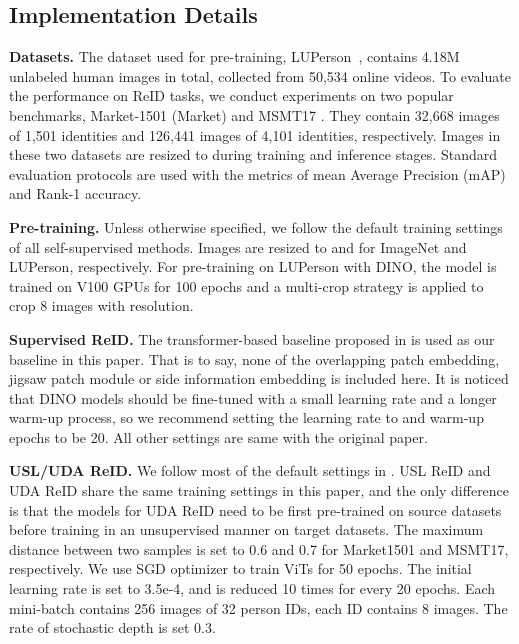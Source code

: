 \documentclass[10pt,twocolumn,letterpaper]{article}
\begin{document}
\subsection{Implementation Details}

\noindent\textbf{Datasets.} The dataset used for pre-training, LUPerson~\cite{fu2021unsupervised}, contains 4.18M unlabeled human images in total, collected from 50,534 online videos. To evaluate the performance on ReID tasks, we conduct experiments on two popular benchmarks, \ie Market-1501 (Market) \cite{Market1501} and MSMT17 \cite{MSMT17}. They contain 32,668 images of 1,501 identities and 126,441 images of 4,101 identities, respectively. Images in these two datasets are resized to  during training and inference stages. Standard evaluation protocols are used with the metrics of mean Average Precision (mAP) and Rank-1 accuracy.

\noindent\textbf{Pre-training.} Unless otherwise specified, we follow the default training settings of all self-supervised methods. Images are resized to  and  for ImageNet and LUPerson, respectively. For pre-training on LUPerson with DINO, the model is trained on V100 GPUs for 100 epochs and a multi-crop strategy is applied to crop 8 images with  resolution. 


\noindent\textbf{Supervised ReID.} The transformer-based baseline proposed in \cite{he2021transreid} is used as our baseline in this paper. That is to say, none of the overlapping patch embedding, jigsaw patch module or side information embedding is included here. It is noticed that DINO models should be fine-tuned with a small learning rate and a longer warm-up process, so we recommend setting the learning rate to  and warm-up epochs to be 20. All other settings are same with the original paper.

\noindent\textbf{USL/UDA ReID.} We follow most of the default settings in \cite{dai2021cluster}. USL ReID and UDA ReID share the same training settings in this paper, and the only difference is that the models for UDA ReID need to be first pre-trained on source datasets before training in an unsupervised manner on target datasets. The maximum distance  between two samples is set to 0.6 and 0.7 for Market1501 and MSMT17, respectively. We use SGD optimizer to train ViTs for 50 epochs. The initial learning rate is set to 3.5e-4, and is reduced 10 times for every 20 epochs. Each mini-batch contains 256 images of 32 person IDs, \ie each ID contains 8 images. The rate of stochastic depth is set 0.3.
\end{document}
